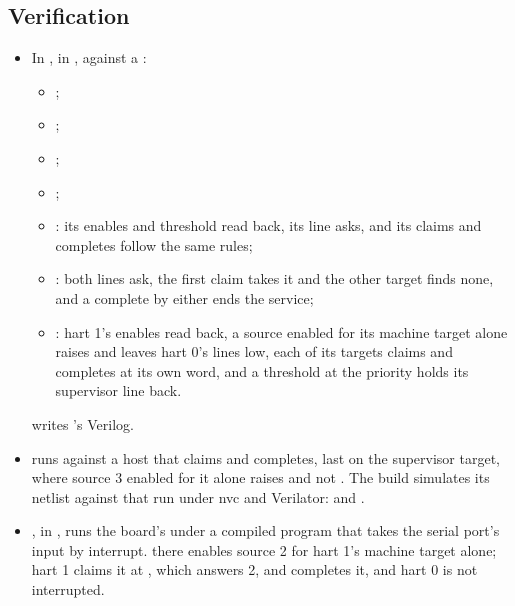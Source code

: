 \subsection*{Verification}

\begin{itemize}
\item In , in , against a
:
\begin{itemize}
\item {};
\item {};
\item {};
\item {};
\item {}: its
enables and threshold read back, its line asks, and its claims and
completes follow the same rules;
\item {}:
both lines ask, the first claim takes it and the other target finds
none, and a complete by either ends the service;
\item {}\allowbreak
{}: hart 1's
enables read back, a source enabled for its machine target alone
raises  and leaves hart 0's lines low, each of its targets
claims and completes at its own word, and a threshold at the priority
holds its supervisor line back.
\end{itemize}
 writes 's
Verilog.
\item {} runs  against a host that
claims and completes, last on the supervisor target, where source 3
enabled for it alone raises  and not . The build
simulates its netlist against that run under nvc and Verilator: 
and .
\item {}, in
, runs the board's  under a
compiled program that takes the serial port's input by interrupt.
\allowbreak
{} there enables source
2 for hart 1's machine target alone; hart 1 claims it at
, which answers 2, and completes it, and hart 0 is not
interrupted.
\end{itemize}

